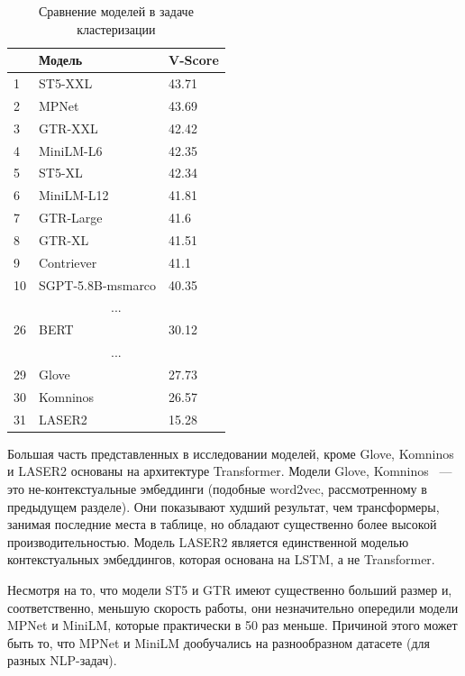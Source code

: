 \begin{table}[ht]
    \caption{Сравнение моделей в задаче кластеризации \cite{mteb}}
    \label{tab:mteb}
    \begin{tabularx}{\textwidth}{|l|X|X|}
        \hline
        & Модель & V-Score \\
        \hline
        1 & ST5-XXL & 43.71 \\
        \hline
        2 & MPNet & 43.69 \\
        \hline
        3 & GTR-XXL & 42.42 \\
        \hline
        4 & MiniLM-L6 & 42.35 \\
        \hline
        5 & ST5-XL & 42.34 \\
        \hline
        6 & MiniLM-L12 & 41.81 \\
        \hline
        7 & GTR-Large & 41.6 \\
        \hline
        8 & GTR-XL & 41.51 \\
        \hline
        9 & Contriever & 41.1 \\
        \hline
        10 & SGPT-5.8B-msmarco & 40.35 \\
        \hline
        \multicolumn{3}{c}{...} \\
        \hline
        26 & BERT & 30.12 \\
        \hline
        \multicolumn{3}{c}{...} \\
        \hline
        29 & Glove & 27.73 \\
        \hline
        30 & Komninos & 26.57 \\
        \hline
        31 & LASER2 & 15.28 \\
        \hline

    \end{tabularx}
\end{table}

Большая часть представленных в исследовании моделей, кроме Glove, Komninos и LASER2 основаны на архитектуре Transformer. Модели Glove, Komninos ~--- это не-контекстуальные эмбеддинги (подобные word2vec, рассмотренному в предыдущем разделе). Они показывают худший результат, чем трансформеры, занимая последние места в таблице, но обладают существенно более высокой производительностью. Модель LASER2 является единственной моделью контекстуальных эмбеддингов, которая основана на LSTM, а не Transformer.

Несмотря на то, что модели ST5 и GTR имеют существенно больший размер и, соответственно, меньшую скорость работы, они незначительно опередили модели MPNet и MiniLM, которые практически в 50 раз меньше. Причиной этого может быть то, что MPNet и MiniLM дообучались на разнообразном датасете (для разных NLP-задач).


